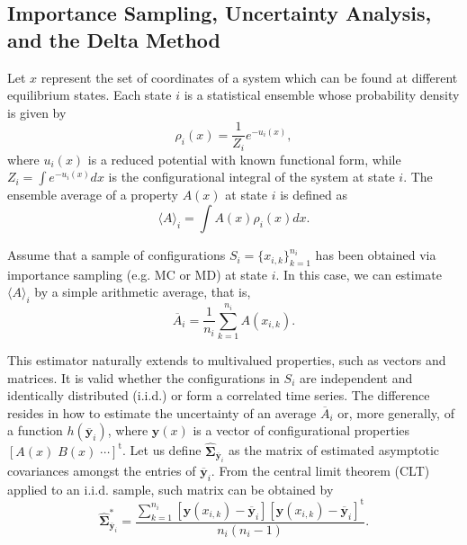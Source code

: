 \documentclass[journal=jctcce,manuscript=article]{achemso}
\newcommand{\mt}[1]{\boldsymbol{\mathbf{#1}}}   %
\newcommand{\vt}[1]{\boldsymbol{\mathbf{#1}}}   %
\newcommand{\tr}[1]{#1^\text{t}}                %
\newcommand{\avg}[1]{\overline{#1}}             %
\begin{document}
\subsection{Importance Sampling, Uncertainty Analysis, and the Delta Method}
\label{sec:definitions}

Let $x$ represent the set of coordinates of a system which can be found at different equilibrium states. Each state $i$ is a statistical ensemble whose probability density is given by
\begin{equation}
\label{eq:state_prob_density}
\rho_i(x) = \frac{1}{Z_i} e^{-u_i(x)},
\end{equation}
where $u_i(x)$ is a reduced potential \cite{Shirts_2008, Chodera_2011_2} with known functional form, while $Z_i = \int e^{-u_i(x)}dx$ is the configurational integral of the system at state $i$. The ensemble average of a property $A(x)$ at state $i$ is defined as
\begin{equation}
\label{eq:ensemble average}
\langle A \rangle_i = \int A(x)\rho_i(x)dx.
\end{equation}

Assume that a sample of configurations $S_i = \{x_{i,k}\}_{k=1}^{n_i}$ has been obtained via importance sampling \cite{Allen_1987} (e.g. MC or MD) at state $i$. In this case, we can estimate $\langle A \rangle_i$ by a simple arithmetic average, that is,
\begin{equation}
\label{eq:average estimator}
\avg A_i = \frac{1}{n_i} \sum_{k=1}^{n_i} A(x_{i,k}).
\end{equation}

This estimator naturally extends to multivalued properties, such as vectors and matrices. It is valid whether the configurations in $S_i$ are independent and identically distributed (i.i.d.) or form a correlated time series. The difference resides in how to estimate the uncertainty of an average $\avg A_i$ or, more generally, of a function $h(\avg {\vt y}_i)$, where $\vt y(x)$ is a vector of configurational properties $\tr{[A(x) \; B(x) \; \cdots]}$. Let us define $\hat{\mt \Sigma}_{\avg{\vt y}_i}$ as the matrix of estimated asymptotic covariances amongst the entries of $\avg{\vt y}_i$. From the central limit theorem (CLT) applied to an i.i.d. sample, such matrix can be obtained by
\begin{equation}
\label{eq:asymptotic covariance IID}
\hat{\mt \Sigma}^\ast_{\avg{\vt y}_i} = \frac{\sum\limits_{k=1}^{n_i} \left[\vt y(x_{i,k}) - \avg{\vt y}_i\right] \tr{\left[\vt y(x_{i,k}) - \avg{\vt y}_i\right]}}{n_i(n_i - 1)}.
\end{equation}
\end{document}
